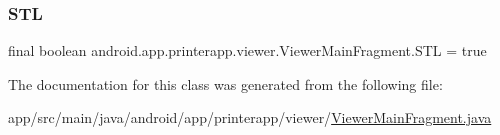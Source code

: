 \mbox{\label{classandroid_1_1app_1_1printerapp_1_1viewer_1_1_viewer_main_fragment_ac118bd371490a2a8a61d62d3b8dfa20b}} 
\subsubsection{\texorpdfstring{S\+TL}{STL}}
{\footnotesize\ttfamily final boolean android.\+app.\+printerapp.\+viewer.\+Viewer\+Main\+Fragment.\+S\+TL = true\hspace{0.3cm}{\ttfamily [static]}}



The documentation for this class was generated from the following file\+:\begin{DoxyCompactItemize}
\item 
app/src/main/java/android/app/printerapp/viewer/\hyperlink{_viewer_main_fragment_8java}{Viewer\+Main\+Fragment.\+java}\end{DoxyCompactItemize}
